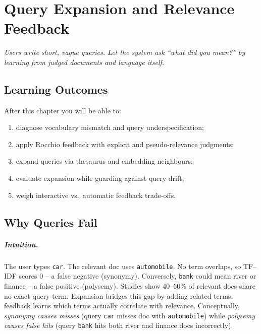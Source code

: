 \chapter{Query Expansion and Relevance Feedback}\label{ch:expansion}
\begin{center}\small\textit{Users write short, vague queries. Let the system ask ``what did you mean?'' by learning from judged documents and language itself.}\end{center}

\noindent{}
\vspace{0.4em}

\section*{Learning Outcomes}
After this chapter you will be able to:
\begin{enumerate}[label=(L\arabic*)]
  \item diagnose vocabulary mismatch and query underspecification;
  \item apply Rocchio feedback with explicit and pseudo-relevance judgments;
  \item expand queries via thesaurus and embedding neighbours;
  \item evaluate expansion while guarding against query drift;
  \item weigh interactive vs.\ automatic feedback trade-offs.
\end{enumerate}

\section{Why Queries Fail}\label{sec:mismatch}
\paragraph{Intuition.} The user types \texttt{car}. The relevant doc uses \texttt{automobile}. No term overlaps, so TF--IDF scores $0$ -- a false negative (synonymy). Conversely, \texttt{bank} could mean river or finance -- a false positive (polysemy). Studies show 40--60\% of relevant docs share no exact query term. Expansion bridges this gap by adding related terms; feedback learns which terms actually correlate with relevance. Conceptually, \emph{synonymy causes misses} (query \texttt{car} misses doc with \texttt{automobile}) while \emph{polysemy causes false hits} (query \texttt{bank} hits both river and finance docs incorrectly).

